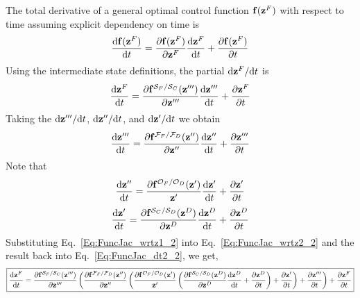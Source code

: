 The total derivative of a general optimal control function  $\mathbf{f}(\mathbf{z}^{F})$ with respect to time assuming explicit dependency on time is
%
\begin{equation}
\frac{\text{d} \mathbf{f}(\mathbf{z}^{F})}{\text{d} t} =
\frac{\partial \mathbf{f}(\mathbf{z}^{F})}{\partial\mathbf{z}^{F}}\frac{\text{d} \mathbf{z}^{F}}{\text{d} t} + \frac{\partial \mathbf{f}(\mathbf{z}^{F})}{\partial t}
\end{equation}
%
Using the intermediate state definitions, the partial $\text{d} \mathbf{z}^{F}/\text{d} t$ is
%
\begin{equation}
   \frac{\text{d} \mathbf{z}^{F}}{\text{d} t} = \frac{\partial \mathbf{f}^{\mathcal{S}_F / \mathcal{S}_C}(\mathbf{z}''')}{\partial\mathbf{z}'''}\frac{\text{d} \mathbf{z}'''}{\text{d} t}  + \frac{\partial \mathbf{z}^{F}}{\partial t}
\end{equation}
%
Taking the $\text{d} \mathbf{z}''' / \text{d} t$, $\text{d} \mathbf{z}'' / \text{d} t$, and $\text{d} \mathbf{z}' / \text{d} t$ we obtain
%
\begin{equation}
   \frac{\text{d} \mathbf{z}'''}{\text{d} t} =  \frac{\partial \mathbf{f}^{\mathcal{F}_F / \mathcal{F}_D}(\mathbf{z}'')}{\partial \mathbf{z}''}\frac{\text{d} \mathbf{z}''}{\text{d} t} +  \frac{\partial \mathbf{z}'''}{\partial t} \label{Eq:FuncJac_dt2_2}
\end{equation}
Note that
\begin{equation}
   \frac{\text{d} \mathbf{z}''}{\text{d} t} =  \frac{\partial \mathbf{f}^{\mathcal{O}_F / \mathcal{O}_D}(\mathbf{z}')}{\mathbf{z}'}\frac{\text{d} \mathbf{z}'}{\text{d} t} + \frac{\partial \mathbf{z}'}{\partial t} \label{Eq:FuncJac_wrtz2_2}
\end{equation}
%
\begin{equation}
   \frac{\text{d} \mathbf{z}'}{\text{d} t} = \frac{\partial \mathbf{f}^{\mathcal{S}_C / \mathcal{S}_D}(\mathbf{z}^D)}{\partial\mathbf{z}^D} \frac{\text{d}\mathbf{z}^D}{\text{d} t} + \frac{\partial \mathbf{z}^D}{\partial t} \label{Eq:FuncJac_wrtz1_2}
\end{equation}
Substituting Eq.~\eqref{Eq:FuncJac_wrtz1_2} into Eq.~\eqref{Eq:FuncJac_wrtz2_2} and the result back into Eq.~\eqref{Eq:FuncJac_dt2_2}, we get,
\begin{equation}
\boxed{   \frac{\text{d} \mathbf{z}^{F}}{\text{d} t} = \frac{\partial \mathbf{f}^{\mathcal{S}_F / \mathcal{S}_C}(\mathbf{z}''')}{\partial\mathbf{z}'''}\left(\frac{\partial \mathbf{f}^{\mathcal{F}_F / \mathcal{F}_D}(\mathbf{z}'')}{\partial \mathbf{z}''}\left(\frac{\partial \mathbf{f}^{\mathcal{O}_F / \mathcal{O}_D}(\mathbf{z}')}{\mathbf{z}'}\left(\frac{\partial \mathbf{f}^{\mathcal{S}_C / \mathcal{S}_D}(\mathbf{z}^D)}{\partial\mathbf{z}^D} \frac{\text{d}\mathbf{z}^D}{\text{d} t} + \frac{\partial \mathbf{z}^D}{\partial t}\right) + \frac{\partial \mathbf{z}'}{\partial t}\right)+  \frac{\partial \mathbf{z}'''}{\partial t} \right) + \frac{\partial \mathbf{z}^{F}}{\partial t}    }
\end{equation}

